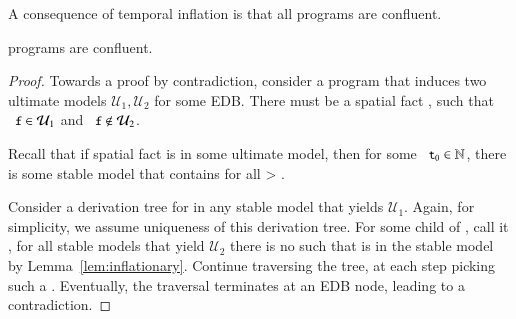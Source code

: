 A consequence of temporal inflation is that all \slang programs are confluent.

\begin{theorem}
\label{thm:confluence}
\slang programs are confluent.
\end{theorem}
\begin{proof}

Towards a proof by contradiction, consider a \slang program that 
induces two ultimate models $\mathcal{U}_1, \mathcal{U}_2$ for some EDB.  There must be a spatial fact , such that 
$\dedalus{f} \in \mathcal{U}_1$ and $\dedalus{f} \not\in \mathcal{U}_2$.

Recall that if spatial fact  is in some ultimate model, then for some $\dedalus{t\sub{0}} \in \mathbb{N}$, there is some stable model that contains  for all  > .

Consider a derivation tree for  in any stable model that yields $\mathcal{U}_1$.  Again, for simplicity, we assume uniqueness of this derivation tree.  For some child of , call it , for all stable models that yield $\mathcal{U}_2$ there is no  such that  is in the stable model by Lemma~\ref{lem:inflationary}.  Continue traversing the tree, at each step picking such a .  Eventually, the traversal terminates at an EDB node, leading to a contradiction.
\end{proof}

